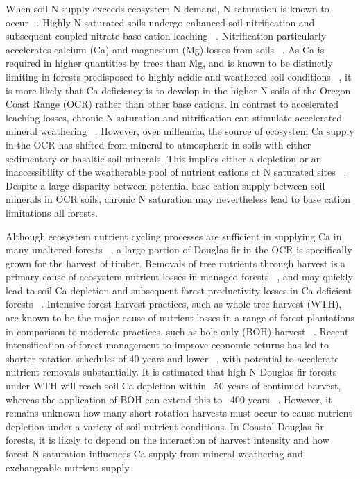 \documentclass[double,12pt]{beavtex}
\begin{document}
When soil N supply exceeds ecosystem N demand, N saturation is known to occur ~\citep{agrenNitrogenSaturationTerrestrial1988}. Highly N saturated soils undergo enhanced soil nitrification and subsequent coupled nitrate-base cation leaching ~\citep{perakisCoupledNitrogenCalcium2006}. Nitrification particularly accelerates calcium (Ca) and magnesium (Mg) losses from soils ~\citep{homann1994}. As Ca is required in higher quantities by trees than Mg, and is known to be distinctly limiting in forests predisposed to highly acidic and weathered soil conditions ~\citep{likensHB1998, federerLongtermDepletionCalcium1989, bigelowNutrientLimitationJuvenile2007}, it is more likely that Ca deficiency is to develop in the higher N soils of the Oregon Coast Range (OCR) rather than other base cations. In contrast to accelerated leaching losses, chronic N saturation and nitrification can stimulate accelerated mineral weathering ~\citep{berthelinMajorRoleNitrification1985, PerakisPettRidge2019}. However, over millennia, the  source of ecosystem Ca supply in the OCR has shifted from mineral to atmospheric in soils with either sedimentary or basaltic soil minerals. This implies either a depletion or an inaccessibility of the weatherable pool of nutrient cations at N saturated sites ~\citep{hynicka2016, leysNaturalAnthropogenicDrivers2016a}. Despite a large disparity between potential base cation supply between soil minerals in OCR soils, chronic N saturation may nevertheless lead to base cation limitations all forests. 

Although ecosystem nutrient cycling processes are sufficient in supplying Ca in many unaltered forests ~\citep{vitousekLitterfallNutrientCycling1984, hiltonNutrientCyclingTropical1987}, a large portion of Douglas-fir in the OCR is specifically grown for the harvest of timber. Removals of tree nutrients through harvest is a primary cause of ecosystem nutrient losses in managed forests ~\citep{johnsonSymposiumForestSite1986}, and may quickly lead to soil Ca depletion and subsequent forest productivity losses in Ca deficient forests ~\citep{federerLongtermDepletionCalcium1989, nykvistTropicalForestsCan2000}. Intensive forest-harvest practices, such as whole-tree-harvest (WTH), are known to be the major cause of nutrient losses in a range of forest plantations in comparison to moderate practices, such as bole-only (BOH) harvest  ~\citep{achatQuantifyingConsequencesRemoving2015}. Recent intensification of forest management to improve economic returns has led to shorter rotation schedules of 40 years and lower ~\citep{diazTradeoffsTimberCarbon2018}, with potential to accelerate nutrient removals substantially. It is estimated that high N Douglas-fir forests under WTH will reach soil Ca depletion within ~50 years of continued harvest, whereas the application of BOH can extend this to ~400 years ~\citep{perakisCoupledNitrogenCalcium2006}. However, it remains unknown how many short-rotation harvests must occur to cause nutrient depletion under a variety of soil nutrient conditions.  In Coastal Douglas-fir forests, it is likely to depend on the interaction of harvest intensity and how forest N saturation influences Ca supply from mineral weathering and exchangeable nutrient supply. 
\end{document}

